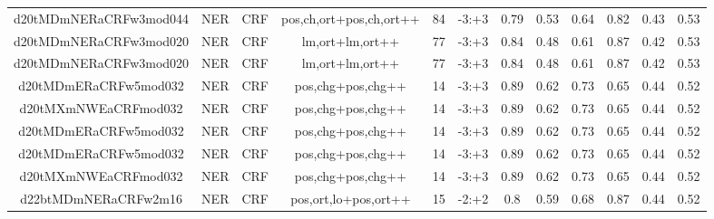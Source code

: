 \documentclass[a4paper]{article}
\begin{document}
\begin{landscape}
\begin{center}
\begin{tabular}{ |c|c|c|c|c|c|c|c|c|c|c|c|}
 
 	
 	\small{ d20tMDmNERaCRFw3mod044 } & \small{ NER} & \small{  CRF }  & pos,ch,ort+pos,ch,ort++  &  84 &  \small{  -3:+3 }  &  0.79 & 0.53 & 0.64  &  0.82 & 0.43 & 0.53 \\
 	

 
 	
 	\small{ d20tMDmNERaCRFw3mod020 } & \small{ NER} & \small{  CRF }  & lm,ort+lm,ort++  &  77 &  \small{  -3:+3 }  &  0.84 & 0.48 & 0.61  &  0.87 & 0.42 & 0.53 \\
 	

 
 	
 	\small{ d20tMDmNERaCRFw3mod020 } & \small{ NER} & \small{  CRF }  & lm,ort+lm,ort++  &  77 &  \small{  -3:+3 }  &  0.84 & 0.48 & 0.61  &  0.87 & 0.42 & 0.53 \\
 	

 
 	
 	\small{ d20tMDmERaCRFw5mod032 } & \small{ NER} & \small{  CRF }  & pos,chg+pos,chg++  &  14 &  \small{  -3:+3 }  &  0.89 & 0.62 & 0.73  &  0.65 & 0.44 & 0.52 \\
 	

 
 	
 	\small{ d20tMXmNWEaCRFmod032 } & \small{ NER} & \small{  CRF }  & pos,chg+pos,chg++  &  14 &  \small{  -3:+3 }  &  0.89 & 0.62 & 0.73  &  0.65 & 0.44 & 0.52 \\
 	

 
 	
 	\small{ d20tMDmERaCRFw5mod032 } & \small{ NER} & \small{  CRF }  & pos,chg+pos,chg++  &  14 &  \small{  -3:+3 }  &  0.89 & 0.62 & 0.73  &  0.65 & 0.44 & 0.52 \\
 	

 
 	
 	\small{ d20tMDmERaCRFw5mod032 } & \small{ NER} & \small{  CRF }  & pos,chg+pos,chg++  &  14 &  \small{  -3:+3 }  &  0.89 & 0.62 & 0.73  &  0.65 & 0.44 & 0.52 \\
 	

 
 	
 	\small{ d20tMXmNWEaCRFmod032 } & \small{ NER} & \small{  CRF }  & pos,chg+pos,chg++  &  14 &  \small{  -3:+3 }  &  0.89 & 0.62 & 0.73  &  0.65 & 0.44 & 0.52 \\
 	

 
 	
 	\small{ d22btMDmNERaCRFw2m16 } & \small{ NER} & \small{  CRF }  & pos,ort,lo+pos,ort++  &  15 &  \small{  -2:+2 }  &  0.8 & 0.59 & 0.68  &  0.87 & 0.44 & 0.52 \\
 	


\end{tabular}
\end{center}
\end{landscape}
\end{document}
